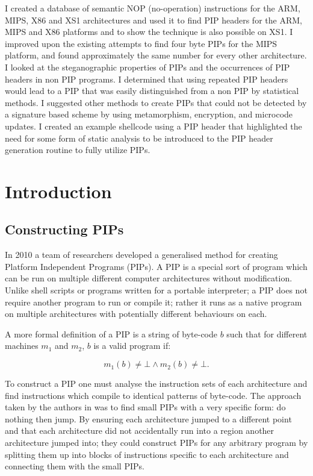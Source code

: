 \documentclass[10pt,]{book}
\begin{document}
I created a database of semantic NOP (no-operation) instructions for the
ARM, MIPS, X86 and XS1 architectures and used it to find PIP headers for
the ARM, MIPS and X86 platforms and to show the technique is also
possible on XS1. I improved upon the existing attempts to find four byte
PIPs for the MIPS platform, and found approximately the same number for
every other architecture. I looked at the steganographic properties of
PIPs and the occurrences of PIP headers in non PIP programs. I
determined that using repeated PIP headers would lead to a PIP that was
easily distinguished from a non PIP by statistical methods. I suggested
other methods to create PIPs that could not be detected by a signature
based scheme by using metamorphism, encryption, and microcode updates. I
created an example shellcode using a PIP header that highlighted the
need for some form of static analysis to be introduced to the PIP header
generation routine to fully utilize PIPs.

\chapter{Introduction}

\section{Constructing PIPs}

In 2010 a team of researchers developed a generalised method for
creating Platform Independent Programs (PIPs)\autocite{Cha:2010uh}. A
PIP is a special sort of program which can be run on multiple different
computer architectures without modification. Unlike shell scripts or
programs written for a portable interpreter; a PIP does not require
another program to run or compile it; rather it runs as a native program
on multiple architectures with potentially different behaviours on each.

A more formal definition of a PIP is a string of byte-code $b$ such that
for different machines $m_1$ and $m_2$, $b$ is a valid program if:

\[m_1(b) \not = \bot \wedge m_2(b) \not =\bot.\]

To construct a PIP one must analyse the instruction sets of each
architecture and find instructions which compile to identical patterns
of byte-code. The approach taken by the authors in \autocite{Cha:2010uh}
was to find small PIPs with a very specific form: do nothing then jump.
By ensuring each architecture jumped to a different point and that each
architecture did not accidentally run into a region another architecture
jumped into; they could construct PIPs for any arbitrary program by
splitting them up into blocks of instructions specific to each
architecture and connecting them with the small PIPs.
\end{document}
